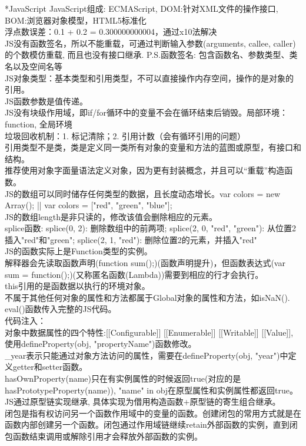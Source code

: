 \documentclass[UTF8]{ctexart}
\makeatletter
\renewcommand{\section}{\@startsection{section}{1}{0mm}
  {-\baselineskip}{0.5\baselineskip}{\bf\leftline}}
\makeatother
\begin{document}
\section*{JavaScript}
\noindent JavaScript组成: ECMAScript, DOM:针对XML文件的操作接口, BOM:浏览器对象模型，HTML5标准化\\
浮点数误差：0.1 + 0.2 = 0.300000000004，通过x10法解决\\
JS没有函数签名，所以不能重载，可通过判断输入参数(arguments, callee, caller)的个数模仿重载, 而且也没有接口继承. P.S.函数签名: 包含函数名、参数类型、类名以及空间名等\\
JS对象类型：基本类型和引用类型，不可以直接操作内存空间，操作的是对象的引用。\\
JS函数参数是值传递。\\
JS没有块级作用域，即if/for循环中的变量不会在循环结束后销毁。局部环境：function, 全局环境\\
垃圾回收机制：1. 标记清除；2. 引用计数（会有循环引用的问题）\\
引用类型不是类，类是定义同一类所有对象的变量和方法的蓝图或原型，有接口和结构。\\
推荐使用对象字面量语法定义对象，因为更有封装概念，并且可以“重载”构造函数。\\
JS的数组可以同时储存任何类型的数据，且长度动态增长。var colors = new Array(); || var colors = ["red", "green", "blue"];\\
JS的数组length是非只读的，修改该值会删除相应的元素。\\
splice函数: splice(0, 2): 删除数组中的前两项; splice(2, 0, "red", "green"): 从位置2插入"red"和"green"; splice(2, 1, "red"): 删除位置2的元素，并插入"red"\\
JS的函数实际上是Function类型的实例。\\
解释器会先读取函数声明(function sum(){};)(函数声明提升)，但函数表达式(var sum = function(){};)(又称匿名函数(Lambda))需要到相应的行才会执行。\\
this引用的是函数据以执行的环境对象。\\
不属于其他任何对象的属性和方法都属于Global对象的属性和方法，如isNaN().\\
eval()函数传入完整的JS代码。\\
代码注入：\\
对象中数据属性的四个特性:[[Configurable]] [[Enumerable]] [[Writable]] [[Value]], 使用defineProperty(obj, "propertyName")函数修改。\\
\_year表示只能通过对象方法访问的属性，需要在defineProperty(obj, "year")中定义getter和setter函数。\\
hasOwnProperty(name)只在有实例属性的时候返回true(对应的是hasPrototypeProperty(name)), "name" in obj在原型属性和实例属性都返回true。\\
JS通过原型链实现继承, 具体实现为借用构造函数+原型链的寄生组合继承。\\
闭包是指有权访问另一个函数作用域中的变量的函数。创建闭包的常用方式就是在函数内部创建另一个函数。闭包通过作用域链继续retain外部函数的实例，直到闭包函数结束调用或解除引用才会释放外部函数的实例。\\
\end{document}
